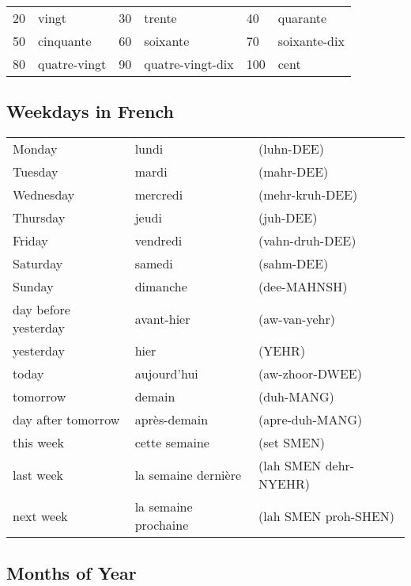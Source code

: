 \begin{tabular}{| l | l | l | l | l | l |}
\hline
20  & vingt         & 30  & trente          & 40  & quarante\\
50  & cinquante     & 60  & soixante        & 70  & soixante-dix\\
80  & quatre-vingt  & 90  & quatre-vingt-dix& 100 & cent\\
\hline
\end{tabular}

\subsection{Weekdays in French}

\begin{tabular}{| l | l | l |}
\hline
Monday    & lundi     & (luhn-DEE)      \\
Tuesday   & mardi     & (mahr-DEE)      \\
Wednesday & mercredi  & (mehr-kruh-DEE) \\
Thursday  & jeudi     & (juh-DEE)       \\
Friday    & vendredi  & (vahn-druh-DEE) \\
Saturday  & samedi    & (sahm-DEE)      \\
Sunday    & dimanche  & (dee-MAHNSH)    \\
\hline
\hline
day before yesterday & avant-hier & (aw-van-yehr) \\
yesterday & hier        & (YEHR)          \\
today     & aujourd'hui & (aw-zhoor-DWEE) \\
tomorrow  & demain      & (duh-MANG)    \\
day after tomorrow & apr\`{e}s-demain & (apre-duh-MANG) \\
this week & cette semaine & (set SMEN)  \\
last week & la semaine dernière   & (lah SMEN dehr-NYEHR)\\
next week & la semaine prochaine  & (lah SMEN proh-SHEN)  \\
\hline
\end{tabular}

\subsection{Months of Year}

